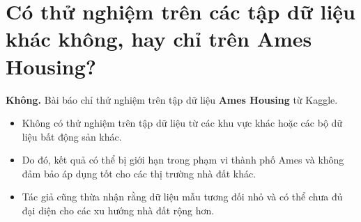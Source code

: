 \section{Có thử nghiệm trên các tập dữ liệu khác không, hay chỉ trên Ames Housing?}
\textbf{Không.} Bài báo chỉ thử nghiệm trên tập dữ liệu \textbf{Ames Housing} từ Kaggle.

\begin{itemize}
    \item Không có thử nghiệm trên tập dữ liệu từ các khu vực khác hoặc các bộ dữ liệu bất động sản khác.
    \item Do đó, kết quả có thể bị giới hạn trong phạm vi thành phố Ames và không đảm bảo áp dụng tốt cho các thị trường nhà đất khác.
    \item Tác giả cũng thừa nhận rằng dữ liệu mẫu tương đối nhỏ và có thể chưa đủ đại diện cho các xu hướng nhà đất rộng hơn.
\end{itemize}
